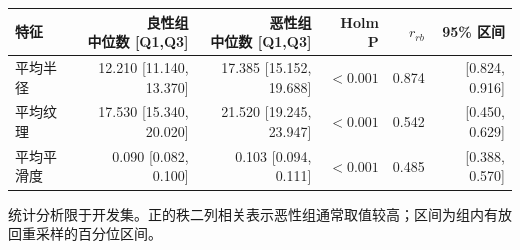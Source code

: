 \begin{center}
\small
\setlength{\tabcolsep}{5pt}
\renewcommand{\arraystretch}{1.25}
\begin{tabular}{lrrrrr}
\toprule
特征 & \shortstack{良性组\\中位数 [Q1,Q3]} & \shortstack{恶性组\\中位数 [Q1,Q3]} & Holm P & $r_{rb}$ & 95\% 区间 \tabularnewline
\midrule
平均半径 & 12.210 [11.140, 13.370] & 17.385 [15.152, 19.688] & $<0.001$ & 0.874 & [0.824, 0.916] \tabularnewline
平均纹理 & 17.530 [15.340, 20.020] & 21.520 [19.245, 23.947] & $<0.001$ & 0.542 & [0.450, 0.629] \tabularnewline
平均平滑度 & 0.090 [0.082, 0.100] & 0.103 [0.094, 0.111] & $<0.001$ & 0.485 & [0.388, 0.570] \tabularnewline
\bottomrule
\end{tabular}
\end{center}
{\footnotesize 统计分析限于开发集。正的秩二列相关表示恶性组通常取值较高；区间为组内有放回重采样的百分位区间。}
